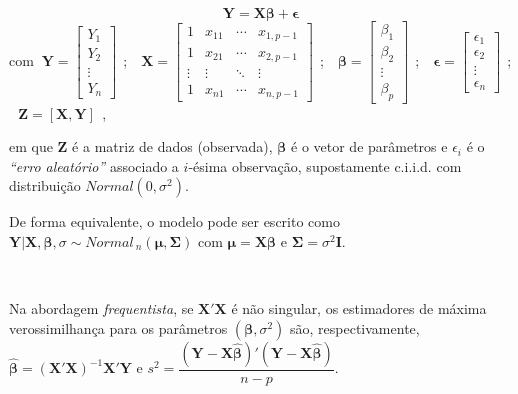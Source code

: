 \documentclass[
]{book}
\begin{document}
\[\boldsymbol{Y} = \boldsymbol{X}\boldsymbol{\beta} + \boldsymbol{\epsilon}\]
com
\(~\boldsymbol{Y} = \left[\begin{array}{c} Y_1\\ Y_2\\ \vdots\\ Y_n \end{array}\right]~~\);
\(~~~\boldsymbol{X} = \left[\begin{array}{cccc} 1 & x_{11} & \cdots & x_{1,p-1}\\ 1 & x_{21} & \cdots & x_{2,p-1}\\ \vdots & \vdots & \ddots & \vdots \\ 1 & x_{n1} & \cdots & x_{n,p-1} \end{array}\right]~~\);
\(~~~\boldsymbol{\beta} = \left[\begin{array}{c} \beta_1\\ \beta_2\\ \vdots\\ \beta_p \end{array}\right]~~\);
\(~~~\boldsymbol{\epsilon} = \left[\begin{array}{c} \epsilon_1\\ \epsilon_2\\ \vdots\\ \epsilon_n \end{array}\right]~~\);
\(~~~\boldsymbol{Z} = \left[\boldsymbol{X,Y}\right]~~\),

em que \(\boldsymbol{Z}\) é a matriz de dados (observada), \(\boldsymbol{\beta}\) é o vetor de parâmetros e \(\epsilon_i\) é o \emph{``erro aleatório''} associado a \(i\)-ésima observação, supostamente c.i.i.d. com distribuição \(\textit{Normal}(0,\sigma^2)\).

De forma equivalente, o modelo pode ser escrito como \(\boldsymbol{Y}|\boldsymbol{X},\boldsymbol{\beta},\sigma \sim \textit{Normal}_{~n}(\boldsymbol{\mu},\boldsymbol{\Sigma})\) com \(\boldsymbol{\mu}=\boldsymbol{X}\boldsymbol{\beta}\) e \(\boldsymbol{\Sigma}=\sigma^2\boldsymbol{I}\).

\(~\)

Na abordagem \emph{frequentista}, se \(\boldsymbol{X}'\boldsymbol{X}\) é não singular, os estimadores de máxima verossimilhança para os parâmetros \((\boldsymbol{\beta},\sigma^2)\) são, respectivamente, \(\hat{\boldsymbol{\beta}} = (\boldsymbol{X}'\boldsymbol{X})^{-1}\boldsymbol{X}'\boldsymbol{Y}\) e \(s^2 = \dfrac{(\boldsymbol{Y}-\boldsymbol{X}\hat{\boldsymbol{\beta}})'(\boldsymbol{Y}-\boldsymbol{X}\hat{\boldsymbol{\beta}})}{n-p}\).
\end{document}
